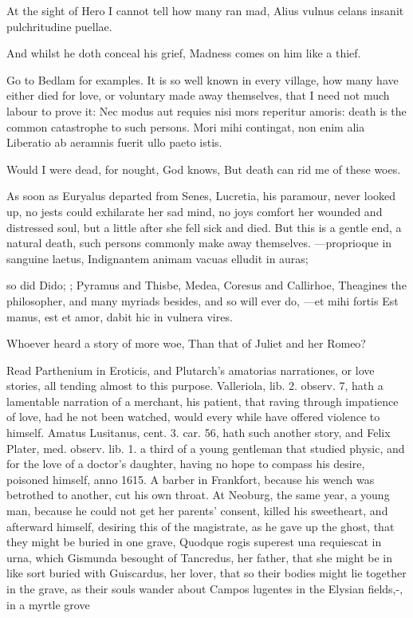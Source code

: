 {At the sight of Hero I cannot tell how many ran mad,
Alius vulnus celans insanit pulchritudine puellae.

And whilst he doth conceal his grief,
Madness comes on him like a thief.

Go to Bedlam for examples. It is so well known in every village, how
many have either died for love, or voluntary made away themselves, that
I need not much labour to prove it: Nec modus aut requies nisi
mors reperitur amoris: death is the common catastrophe to such persons.
Mori mihi contingat, non enim alia
Liberatio ab aeramnis fuerit ullo paeto istis.

Would I were dead, for nought, God knows,
But death can rid me of these woes.

As soon as Euryalus departed from Senes, Lucretia, his paramour, never
looked up, no jests could exhilarate her sad mind, no joys comfort her
wounded and distressed soul, but a little after she fell sick and died.
But this is a gentle end, a natural death, such persons commonly make
away themselves.
---proprioque in sanguine laetus,
Indignantem animam vacuas elludit in auras;

so did Dido; ; 
Pyramus and Thisbe, Medea, Coresus and Callirhoe, Theagines
the philosopher, and many myriads besides, and so will ever do,
---et mihi fortis
Est manus, est et amor, dabit hic in vulnera vires.

Whoever heard a story of more woe,
Than that of Juliet and her Romeo?

Read Parthenium in Eroticis, and Plutarch's amatorias narrationes, or
love stories, all tending almost to this purpose. Valleriola, lib. 2.
observ. 7, hath a lamentable narration of a merchant, his patient,
 that raving through impatience of love, had he not been watched,
would every while have offered violence to himself. Amatus Lusitanus,
cent. 3. car. 56, hath such another story, and Felix Plater, med.
observ. lib. 1. a third of a young gentleman that studied physic,
and for the love of a doctor's daughter, having no hope to compass his
desire, poisoned himself, anno 1615. A barber in Frankfort,
because his wench was betrothed to another, cut his own throat.
At Neoburg, the same year, a young man, because he could not get
her parents' consent, killed his sweetheart, and afterward himself,
desiring this of the magistrate, as he gave up the ghost, that they
might be buried in one grave, Quodque rogis superest una requiescat in
urna, which  Gismunda besought of Tancredus, her father, that she
might be in like sort buried with Guiscardus, her lover, that so their
bodies might lie together in the grave, as their souls wander about
Campos lugentes in the Elysian fields,-, in a myrtle grove

}
